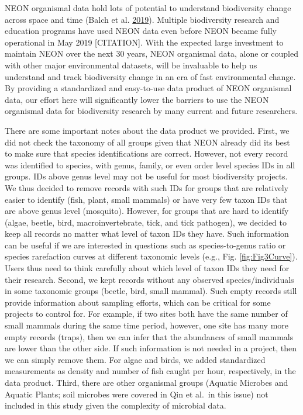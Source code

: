 \documentclass[
  12pt,
]{article}
\begin{document}
NEON organismal data hold lots of potential to understand biodiversity change across space and time (Balch et al. \protect\hyperlink{ref-balch2019neon}{2019}). Multiple biodiversity research and education programs have used NEON data even before NEON became fully operational in May 2019 {[}CITATION{]}. With the expected large investment to maintain NEON over the next 30 years, NEON organismal data, alone or coupled with other major environmental datasets, will be invaluable to help us understand and track biodiversity change in an era of fast environmental change. By providing a standardized and easy-to-use data product of NEON organismal data, our effort here will significantly lower the barriers to use the NEON organismal data for biodiversity research by many current and future researchers.

There are some important notes about the data product we provided. First, we did not check the taxonomy of all groups given that NEON already did its best to make sure that species identifications are correct. However, not every record was identified to species, with genus, family, or even order level species IDs in all groups. IDs above genus level may not be useful for most biodiversity projects. We thus decided to remove records with such IDs for groups that are relatively easier to identify (fish, plant, small mammals) or have very few taxon IDs that are above genus level (mosquito). However, for groups that are hard to identify (algae, beetle, bird, macroinvertebrate, tick, and tick pathogen), we decided to keep all records no matter what level of taxon IDs they have. Such information can be useful if we are interested in questions such as species-to-genus ratio or species rarefaction curves at different taxonomic levels (e.g., Fig. \ref{fig:Fig3Curve}). Users thus need to think carefully about which level of taxon IDs they need for their research. Second, we kept records without any observed species/individuals in some taxonomic groups (beetle, bird, small mammal). Such empty records still provide information about sampling efforts, which can be critical for some projects to control for. For example, if two sites both have the same number of small mammals during the same time period, however, one site has many more empty records (traps), then we can infer that the abundances of small mammals are lower than the other side. If such information is not needed in a project, then we can simply remove them. For algae and birds, we added standardized measurements as density and number of fish caught per hour, respectively, in the data product. Third, there are other organismal groups (Aquatic Microbes and Aquatic Plants; soil microbes were covered in Qin et al.~in this issue) not included in this study given the complexity of microbial data.
\end{document}
